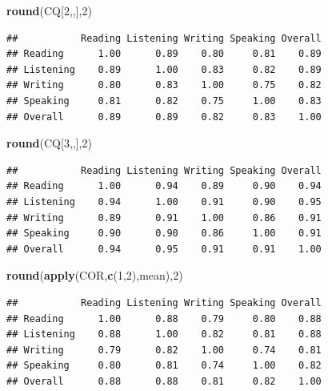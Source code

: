 \documentclass[12pt]{article}
\newenvironment{Shaded}{\begin{snugshade}}{\end{snugshade}}
\newcommand{\DecValTok}[1]{\textcolor[rgb]{0.00,0.00,0.81}{#1}}
\newcommand{\FunctionTok}[1]{\textcolor[rgb]{0.13,0.29,0.53}{\textbf{#1}}}
\newcommand{\NormalTok}[1]{#1}
\begin{document}
\begin{Shaded}
\begin{Highlighting}[]
\FunctionTok{round}\NormalTok{(CQ[}\DecValTok{2}\NormalTok{,,],}\DecValTok{2}\NormalTok{)}
\end{Highlighting}
\end{Shaded}

\begin{verbatim}
##           Reading Listening Writing Speaking Overall
## Reading      1.00      0.89    0.80     0.81    0.89
## Listening    0.89      1.00    0.83     0.82    0.89
## Writing      0.80      0.83    1.00     0.75    0.82
## Speaking     0.81      0.82    0.75     1.00    0.83
## Overall      0.89      0.89    0.82     0.83    1.00
\end{verbatim}

\begin{Shaded}
\begin{Highlighting}[]
\FunctionTok{round}\NormalTok{(CQ[}\DecValTok{3}\NormalTok{,,],}\DecValTok{2}\NormalTok{)}
\end{Highlighting}
\end{Shaded}

\begin{verbatim}
##           Reading Listening Writing Speaking Overall
## Reading      1.00      0.94    0.89     0.90    0.94
## Listening    0.94      1.00    0.91     0.90    0.95
## Writing      0.89      0.91    1.00     0.86    0.91
## Speaking     0.90      0.90    0.86     1.00    0.91
## Overall      0.94      0.95    0.91     0.91    1.00
\end{verbatim}

\begin{Shaded}
\begin{Highlighting}[]
\FunctionTok{round}\NormalTok{(}\FunctionTok{apply}\NormalTok{(COR,}\FunctionTok{c}\NormalTok{(}\DecValTok{1}\NormalTok{,}\DecValTok{2}\NormalTok{),mean),}\DecValTok{2}\NormalTok{)}
\end{Highlighting}
\end{Shaded}

\begin{verbatim}
##           Reading Listening Writing Speaking Overall
## Reading      1.00      0.88    0.79     0.80    0.88
## Listening    0.88      1.00    0.82     0.81    0.88
## Writing      0.79      0.82    1.00     0.74    0.81
## Speaking     0.80      0.81    0.74     1.00    0.82
## Overall      0.88      0.88    0.81     0.82    1.00
\end{verbatim}
\end{document}
